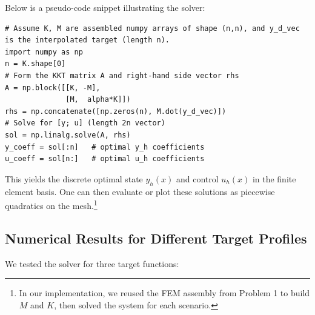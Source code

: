 \documentclass[a4paper,10pt]{report}
\begin{document}
Below is a pseudo-code snippet illustrating the solver:
\begin{verbatim}
# Assume K, M are assembled numpy arrays of shape (n,n), and y_d_vec is the interpolated target (length n).
import numpy as np
n = K.shape[0]
# Form the KKT matrix A and right-hand side vector rhs
A = np.block([[K, -M],
              [M,  alpha*K]])
rhs = np.concatenate([np.zeros(n), M.dot(y_d_vec)])
# Solve for [y; u] (length 2n vector)
sol = np.linalg.solve(A, rhs)
y_coeff = sol[:n]   # optimal y_h coefficients
u_coeff = sol[n:]   # optimal u_h coefficients
\end{verbatim}

This yields the discrete optimal state \(y_h(x)\) and control \(u_h(x)\) in the finite element basis. One can then evaluate or plot these solutions as piecewise quadratics on the mesh.\footnote{In our implementation, we reused the FEM assembly from Problem 1 to build \(M\) and \(K\), then solved the system for each scenario.}

\subsection{Numerical Results for Different Target Profiles}
We tested the solver for three target functions:
\end{document}

